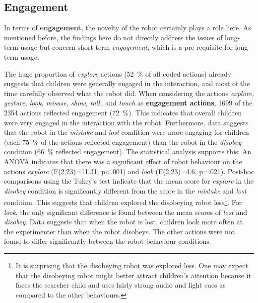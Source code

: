 \documentclass{sig-alternate}
\begin{document}




\subsection{Engagement}

In terms of \textbf{engagement}, the novelty of the robot certainly plays a role
here. As mentioned before, the findings here do not directly address the issues
of long-term usage but concern short-term \textit{engagement}, which is a
pre-requisite for long-term usage.


The huge proportion of \textit{explore} actions (52~\% of all coded actions)
already suggests that children were generally engaged in the interaction, and
most of the time carefully observed what the robot did. When considering the
actions \textit{explore, gesture, look, misuse, show, talk}, and \textit{touch}
as \textbf{engagement actions}, 1699 of the 2354 actions reflected engagement
(72~\%). This indicates that overall children were very engaged in the
interaction with the robot. Furthermore, data suggests that the robot in the
\textit{mistake} and \textit{lost} condition were more engaging for children
(each 75~\% of the actions reflected engagement) than the robot in the
\textit{disobey} condition (66~\% reflected engagement). The statistical
analysis supports this: An ANOVA indicates that there was a significant effect
of robot behaviour on the actions \textit{explore} (F(2,23)=11.31, p<.001) and
\textit{look} (F(2,23)=4.6, p=.021). Post-hoc comparisons using the Tukey's test
indicate that the mean score for \textit{explore} in the \textit{disobey}
condition is significantly different from the score in the \textit{mistake} and
\textit{lost} condition. This suggests that children explored the disobeying
robot less\footnote{It is surprising that the disobeying robot was explored
less. One may expect that the disobeying robot might better attract
children's attention because it faces the searcher child and uses fairly
strong audio and light cues as compared to the other behaviours.}. For
\textit{look}, the only significant difference is found between the mean
scores of \textit{lost} and \textit{disobey}. Data suggests that when the
robot is lost, children look more often at the experimenter than when the
robot disobeys. The other actions were not found to differ significantly
between the robot behaviour conditions.	
\end{document}
